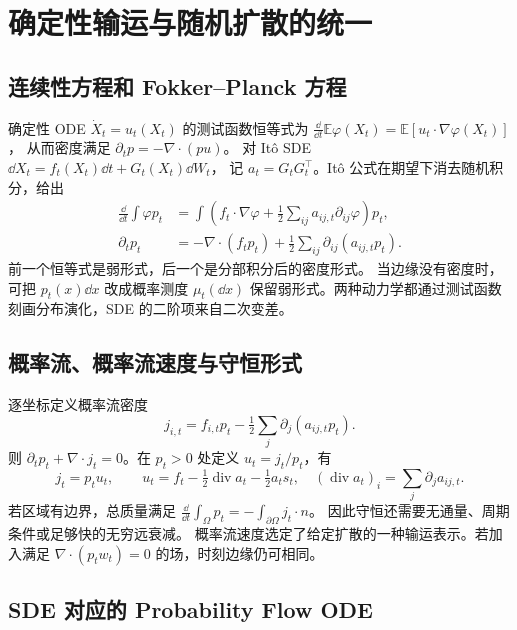 \section{确定性输运与随机扩散的统一}
\label{sec:unified-transport}

\subsection{连续性方程和 Fokker--Planck 方程}

确定性 ODE \(\dot X_t=u_t(X_t)\) 的测试函数恒等式为
\(\frac{\dd}{\dd t}\mathbb E\varphi(X_t)=\mathbb E[u_t\cdot\nabla\varphi(X_t)]\)，
从而密度满足 \(\partial_t p=-\nabla\cdot(pu)\)。
对 It\^o SDE \(\dd X_t=f_t(X_t)\dd t+G_t(X_t)\dd W_t\)，
记 \(a_t=G_tG_t^\top\)。It\^o 公式在期望下消去随机积分，给出
\begin{equation}
 \begin{aligned}
 \frac{\dd}{\dd t}\int\varphi p_t
 &=\int\left(f_t\cdot\nabla\varphi+
             \tfrac12\sum_{ij}a_{ij,t}\partial_{ij}\varphi\right)p_t,\\
 \partial_t p_t&=-\nabla\cdot(f_tp_t)+\tfrac12\sum_{ij}\partial_{ij}(a_{ij,t}p_t).
 \end{aligned}
 \label{eq:unified-fp}
\end{equation}
前一个恒等式是弱形式，后一个是分部积分后的密度形式。
当边缘没有密度时，可把 \(p_t(x)\dd x\) 改成概率测度 \(\mu_t(\dd x)\)
保留弱形式。两种动力学都通过测试函数刻画分布演化，SDE 的二阶项来自二次变差。

\subsection{概率流、概率流速度与守恒形式}

逐坐标定义概率流密度
\[
 j_{i,t}=f_{i,t}p_t-\tfrac12\sum_j\partial_j(a_{ij,t}p_t).
\]
则 \(\partial_t p_t+\nabla\cdot j_t=0\)。在 \(p_t>0\) 处定义 \(u_t=j_t/p_t\)，有
\begin{equation}
 j_t=p_tu_t,\qquad
 u_t=f_t-\tfrac12\operatorname{div}a_t-\tfrac12a_ts_t,
 \quad (\operatorname{div}a_t)_i=\sum_j\partial_j a_{ij,t}.
 \label{eq:unified-current}
\end{equation}
若区域有边界，总质量满足
\(\frac{\dd}{\dd t}\int_\Omega p_t=-\int_{\partial\Omega}j_t\cdot n\)。
因此守恒还需要无通量、周期条件或足够快的无穷远衰减。
概率流速度选定了给定扩散的一种输运表示。若加入满足
\(\nabla\cdot(p_tw_t)=0\) 的场，时刻边缘仍可相同。

\subsection{SDE 对应的 Probability Flow ODE\requiredderivation}


